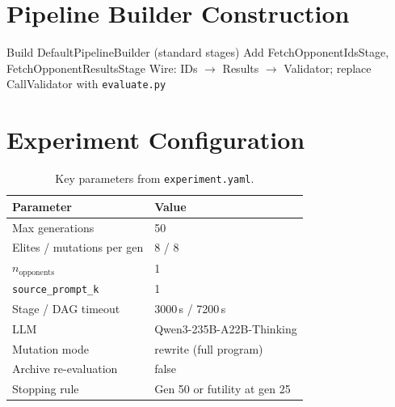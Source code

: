 \documentclass[11pt,a4paper]{article}
\begin{document}
\section{Pipeline Builder Construction}

\begin{algorithm}[H]
\SetAlgoLined\DontPrintSemicolon
\caption{AdversarialAsymmetricPipelineBuilder}
Build DefaultPipelineBuilder (standard stages)\;
Add FetchOpponentIdsStage, FetchOpponentResultsStage\;
Wire: IDs $\to$ Results $\to$ Validator; replace CallValidator with \texttt{evaluate.py}\;
\end{algorithm}

\section{Experiment Configuration}

\begin{table}[H]
\centering\small
\begin{tabular}{@{}ll@{}}
\toprule
\textbf{Parameter} & \textbf{Value} \\
\midrule
Max generations & 50 \\
Elites / mutations per gen & 8 / 8 \\
$n_{\text{opponents}}$ & 1 \\
\texttt{source\_prompt\_k} & 1 \\
Stage / DAG timeout & 3000\,s / 7200\,s \\
LLM & Qwen3-235B-A22B-Thinking \\
Mutation mode & rewrite (full program) \\
Archive re-evaluation & false \\
\midrule
Stopping rule & Gen 50 or futility at gen 25 \\
\bottomrule
\end{tabular}
\caption{Key parameters from \texttt{experiment.yaml}.}
\end{table}
\end{document}
